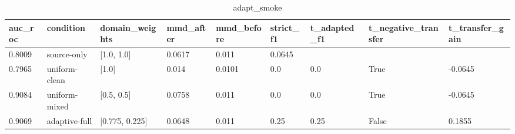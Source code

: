 \begin{table}[h]
\centering
\caption{adapt_smoke}
\label{tab:adapt_smoke}
\begin{tabular}{lllllllll}
\toprule
auc\_roc & condition & domain\_weights & mmd\_after & mmd\_before & strict\_f1 & t\_adapted\_f1 & t\_negative\_transfer & t\_transfer\_gain \\
\midrule
0.8009 & source-only & [1.0, 1.0] & 0.0617 & 0.011 & 0.0645 &  &  &  \\
0.7965 & uniform-clean & [1.0] & 0.014 & 0.0101 & 0.0 & 0.0 & True & -0.0645 \\
0.9084 & uniform-mixed & [0.5, 0.5] & 0.0758 & 0.011 & 0.0 & 0.0 & True & -0.0645 \\
0.9069 & adaptive-full & [0.775, 0.225] & 0.0648 & 0.011 & 0.25 & 0.25 & False & 0.1855 \\
\bottomrule
\end{tabular}
\end{table}
